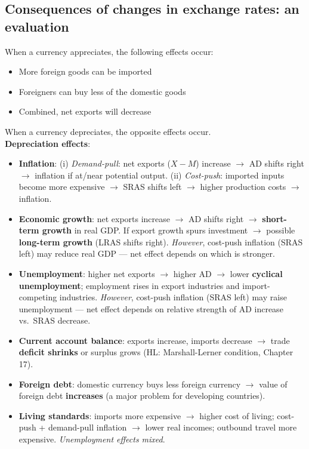 \subsection{Consequences of changes in exchange rates: an evaluation}
When a currency appreciates, the following effects occur:
\begin{itemize}
  \item More foreign goods can be imported
  \item Foreigners can buy less of the domestic goods
  \item Combined, net exports will decrease
\end{itemize}
When a currency depreciates, the opposite effects occur.\\
\textbf{Depreciation effects}:
\begin{itemize}
  \item \textbf{Inflation}: (i) \textit{Demand-pull}: net exports ($X - M$) increase $\to$ AD shifts right $\to$ inflation if at/near potential output. (ii) \textit{Cost-push}: imported inputs become more expensive $\to$ SRAS shifts left $\to$ higher production costs $\to$ inflation.
  \item \textbf{Economic growth}: net exports increase $\to$ AD shifts right $\to$ \textbf{short-term growth} in real GDP. If export growth spurs investment $\to$ possible \textbf{long-term growth} (LRAS shifts right). \textit{However}, cost-push inflation (SRAS left) may reduce real GDP --- net effect depends on which is stronger.
  \item \textbf{Unemployment}: higher net exports $\to$ higher AD $\to$ lower \textbf{cyclical unemployment}; employment rises in export industries and import-competing industries. \textit{However}, cost-push inflation (SRAS left) may raise unemployment --- net effect depends on relative strength of AD increase vs.\ SRAS decrease.
  \item \textbf{Current account balance}: exports increase, imports decrease $\to$ trade \textbf{deficit shrinks} or surplus grows (HL: Marshall-Lerner condition, Chapter 17).
  \item \textbf{Foreign debt}: domestic currency buys less foreign currency $\to$ value of foreign debt \textbf{increases} (a major problem for developing countries).
  \item \textbf{Living standards}: imports more expensive $\to$ higher cost of living; cost-push + demand-pull inflation $\to$ lower real incomes; outbound travel more expensive. \textit{Unemployment effects mixed}.
\end{itemize}
